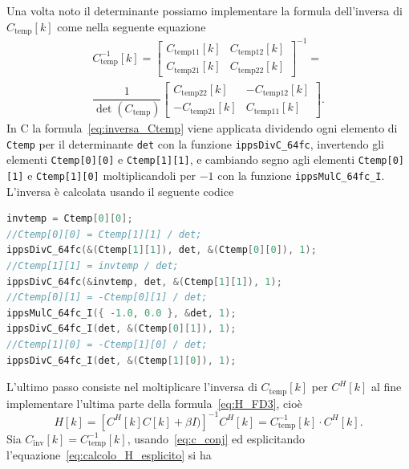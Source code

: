\documentclass[12pt,a4paper,titlepage]{article}
\begin{document}
Una volta noto il determinante possiamo implementare la formula dell'inversa di $C_{\text{temp}}[k]$ come nella seguente equazione
\begin{equation}\label{eq:inversa_Ctemp}
\begin{split}
C_{\text{temp}}^{-1}[k] = 
\begin{bmatrix}
C_{\text{temp11}}[k]	& 	C_{\text{temp12}}[k]\\
C_{\text{temp21}}[k]	& 	C_{\text{temp22}}[k]
\end{bmatrix}^{-1}
=\\\dfrac{1}{\det(C_{\text{temp}})}
\begin{bmatrix}
C_{\text{temp22}}[k]	& 	-C_{\text{temp12}}[k]\\
-C_{\text{temp21}}[k]	& 	C_{\text{temp11}}[k]
\end{bmatrix}
.
\end{split}
\end{equation}
In C la formula~\eqref{eq:inversa_Ctemp} viene applicata dividendo ogni elemento di \texttt{Ctemp} per il determinante \texttt{det} con la funzione \texttt{ippsDivC\_64fc}, invertendo gli elementi \texttt{Ctemp[0][0]} e \texttt{Ctemp[1][1]}, e cambiando segno agli elementi \texttt{Ctemp[0][1]} e \texttt{Ctemp[1][0]} moltiplicandoli per $-1$ con la funzione \texttt{ippsMulC\_64fc\_I}. L'inversa è calcolata usando il seguente codice
\begin{lstlisting}[language=cpp, label=code:inversa_Ctemp, caption = Calcolo dell'inversa della matrice \texttt{Ctemp}, breaklines = false, captionpos = b]
invtemp = Ctemp[0][0];
//Ctemp[0][0] = Ctemp[1][1] / det;
ippsDivC_64fc(&(Ctemp[1][1]), det, &(Ctemp[0][0]), 1);
//Ctemp[1][1] = invtemp / det;
ippsDivC_64fc(&invtemp, det, &(Ctemp[1][1]), 1);
//Ctemp[0][1] = -Ctemp[0][1] / det;
ippsMulC_64fc_I({ -1.0, 0.0 }, &det, 1);
ippsDivC_64fc_I(det, &(Ctemp[0][1]), 1);
//Ctemp[1][0] = -Ctemp[1][0] / det;
ippsDivC_64fc_I(det, &(Ctemp[1][0]), 1);
\end{lstlisting}
L'ultimo passo consiste nel moltiplicare l'inversa di $C_{\text{temp}}[k]$ per $C^H[k]$ al fine implementare l'ultima parte della formula~\eqref{eq:H_FD3}, cioè
\begin{equation}\label{eq:calcolo_H}
H[k] = \left[C^H[k] C[k] + \beta I)\right]^{-1} C^H[k] = C_{\text{temp}}^{-1}[k] \cdot C^H[k].
\end{equation}
Sia $C_{\text{inv}}[k] = C_{\text{temp}}^{-1}[k]$, usando~\eqref{eq:c_conj} ed esplicitando l'equazione~\eqref{eq:calcolo_H_esplicito} si ha
\end{document}
